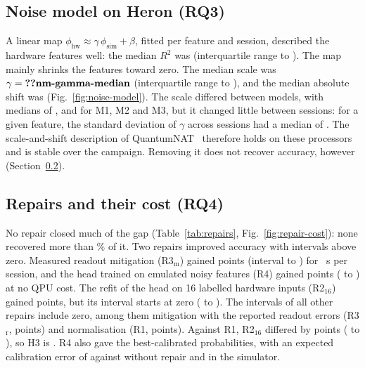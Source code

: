 \subsection{Noise model on Heron (RQ3)}
\label{sec:rq3}
A linear map $\phi_{\mathrm{hw}}\approx\gamma\,\phi_{\mathrm{sim}}+\beta$, fitted per feature
and session, described the hardware features well: the median $R^2$ was 
(interquartile range  to ). The map mainly shrinks the features
toward zero. The median scale was $\gamma=\val{nm-gamma-median}$ (interquartile range
 to ), %
and the median absolute shift was  (Fig.~\ref{fig:noise-model}). The scale
differed between models, with medians of ,  and
 for M1, M2 and M3, %
but it changed little between sessions: for a given feature, the standard deviation of $\gamma$
across sessions had a median of . %
The scale-and-shift description of QuantumNAT~\cite{wang2022quantumnat} therefore holds on these
processors and is stable over the campaign. Removing it does not recover accuracy, however
(Section~\ref{sec:rq4}).

\subsection{Repairs and their cost (RQ4)}
\label{sec:rq4}
No repair closed much of the gap (Table~\ref{tab:repairs}, Fig.~\ref{fig:repair-cost}): none
recovered more than \% of it. %
Two repairs improved accuracy with intervals above zero. %
Measured readout mitigation (R3$_\mathrm{m}$) gained  points (interval
 to ) for ~s per session, and the head trained
on emulated noisy features (R4) gained  points ( to
) at no QPU cost. %
The refit of the head on 16 labelled hardware inputs (R2$_{16}$) gained 
points, but its interval starts at zero ( to ). %
The intervals of all other repairs include zero, among them mitigation with the reported readout
errors (R3$_\mathrm{r}$,  points) and normalisation (R1, 
points). %
Against R1, R2$_{16}$ differed by  points ( to ), so
H3 is . R4 also gave the best-calibrated probabilities, with an expected
calibration error of  against  without repair and  in the
simulator. %

